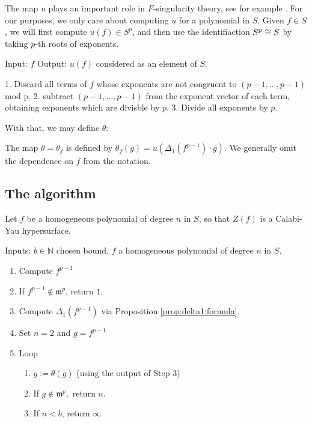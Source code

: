 The map \(u\) plays an important role in \(F\)-singularity
theory, see for example 
\cite[Claim~2.6]{ma-polstra-2021-F-sing-comm-alg}.
For our purposes, we only care about computing \(u\) 
for a polynomial in \(S\). 
Given \(f \in S\), we will first compute
\(u(f) \in S^{p}\), and then use the identifiaction
\(S^{p} \cong S\) by taking \(p\)-th roots of 
exponents.

\begin{alg}
	\label{alg:naive:u}
	Input: \(f\) 
	Output: \(u(f)\) considered as an element of \(S\).

	1. Discard all terms of \(f\) whose exponents are not congruent to
	\((p-1, \ldots, p-1)\) mod p.
	2. subtract \((p-1, \ldots, p-1)\) from the exponent vector of 
	each term, obtaining exponents which are divisble by \(p\).
	3. Divide all exponents by \(p\).
\end{alg}

With that, we may define \(\theta\):

\begin{defn}
	The map \(\theta = \theta_{f}\) is defined by 
	\(\theta_{f}(g) = u(\Delta_{1}(f^{p-1}) \cdot g)\).
	We generally omit the dependence on \(f\) from
	the notation.
\end{defn}

\subsection{The algorithm}

Let \(f\) be a homogeneous polynomial of degree \(n\) 
in \(S\), 
so that \(Z(f)\) is a Calabi-Yau hypersurface.

\begin{alg}
	\label{alg:qfs:outline}

	Inputs: \(b \in \mathbb{N}\) chosen bound, \(f\) a homogeneous
	polynomial of degree \(n\) in \(S\).
	\begin{enumerate}[(1)]
		\item Compute \(f^{p-1}\)
		\item If \(f^{p-1} \notin \mathfrak{m}^{p}\), return \(1\). 
		\item Compute \(\Delta_{1}(f^{p-1})\) via Proposition \ref{prop:delta1:formula}.
		\item Set \(n = 2\) and \(g = f^{p-1}\)
		\item Loop
			\begin{enumerate}[(1)]
				\item \(g := \theta(g)\) (using the output of Step 3)
				\item If \(g \notin \mathfrak{m}^{p},\) return \(n\).
				\item If \(n < b\), return \(\infty\)	
			\end{enumerate}
	\end{enumerate}
\end{alg}

